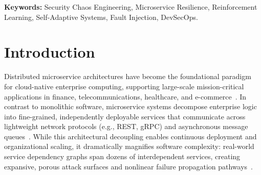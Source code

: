 \documentclass[11pt,a4paper]{article}
\begin{document}
\begin{abstract}
Our empirical evaluation and repeated-measures statistical analysis reveal critical operational trade-offs: while static rule-based heuristics achieve high local risk reduction ($55.5\% \pm 4.8\%$) under alert triggers, they induce severe mitigation churn (deploying redundant actions with a $30.8\% \pm 4.9\%$ false mitigation rate, $15.4 \pm 2.5$ wrong actions/ep). In contrast, SecChaos-RL balances multi-objective stability, achieving significantly faster recovery under cascading failure compared to conservative DevOps heuristics ($\text{MTTR} = 1.79 \pm 0.53$ steps vs. $2.29 \pm 0.30$ for Threshold-Based, paired $p_{holm} = 0.0013$; and $2.24 \pm 0.23$ for Queue-Aware Cooldown, paired $p_{holm} = 0.0013$), cutting unnecessary dispatches by half compared to greedy rules ($7.5 \pm 1.9$ vs. $15.4 \pm 2.5$ wrong actions/ep, out of $35.3 \pm 3.0$ vs. $50.0 \pm 0.1$ total actions/ep; $\text{FMR} = 20.9\% \pm 4.4\%$ vs. $30.8\% \pm 4.9\%$), and executing decisions with sub-millisecond latency ($0.44 \pm 0.15$\,ms per-step benchmark latency; $0.46 \pm 0.52$\,ms mean, $1.04$\,ms $p_{99}$ micro-benchmark on CPU). A systematic six-stage ablation study substantiates the operational trade-offs of each architectural mechanism, and our findings establish practical deployment boundaries between deterministic heuristics and autonomous reinforcement learning control.
\end{abstract}

\vspace{0.5em}
\noindent\textbf{Keywords:} Security Chaos Engineering, Microservice Resilience, Reinforcement Learning, Self-Adaptive Systems, Fault Injection, DevSecOps.

\newpage

\section{Introduction}
\label{sec:introduction}

Distributed microservice architectures have become the foundational paradigm for cloud-native enterprise computing, supporting large-scale mission-critical applications in finance, telecommunications, healthcare, and e-commerce~\cite{basiri2016chaos, aderaldo2025declarative, soldani2023microservice}. In contrast to monolithic software, microservice systems decompose enterprise logic into fine-grained, independently deployable services that communicate across lightweight network protocols (e.g., REST, gRPC) and asynchronous message queues~\cite{taibi2021microservice, camacho2022chaos}. While this architectural decoupling enables continuous deployment and organizational scaling, it dramatically magnifies software complexity: real-world service dependency graphs span dozens of interdependent services, creating expansive, porous attack surfaces and nonlinear failure propagation pathways~\cite{esen2025chaos, myrbakken2020security}.
\end{document}

